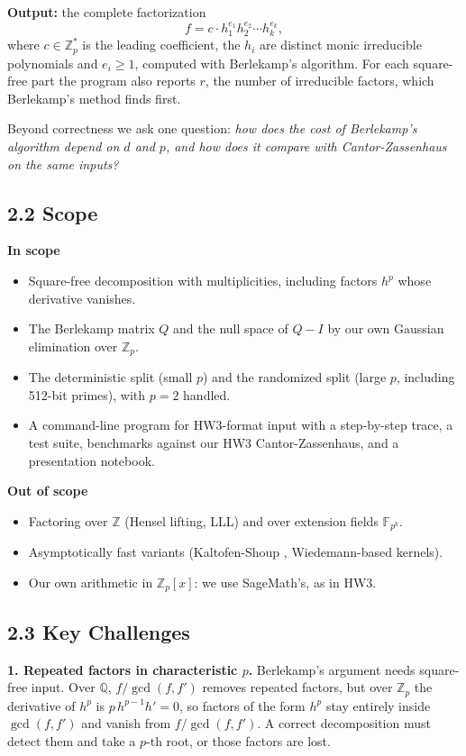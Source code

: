 \documentclass[11pt,a4paper]{article}
\newcommand{\Zp}{\mathbb{Z}_p}
\newcommand{\Zpx}{\mathbb{Z}_p[x]}
\begin{document}
\textbf{Output:} the complete factorization
\[
  f = c \cdot h_1^{e_1} h_2^{e_2} \cdots h_k^{e_k},
\]
where $c \in \Zp^{*}$ is the leading coefficient, the $h_i$ are distinct monic irreducible
polynomials and $e_i \ge 1$, computed with Berlekamp's algorithm. For each square-free part the
program also reports $r$, the number of irreducible factors, which Berlekamp's method finds first.

Beyond correctness we ask one question: \emph{how does the cost of Berlekamp's algorithm depend on
$d$ and $p$, and how does it compare with Cantor-Zassenhaus on the same inputs?}

\subsection*{2.2 Scope}

\textbf{In scope}
\begin{itemize}
    \item Square-free decomposition with multiplicities, including factors $h^p$ whose derivative vanishes.
    \item The Berlekamp matrix $Q$ and the null space of $Q - I$ by our own Gaussian elimination over $\Zp$.
    \item The deterministic split (small $p$) and the randomized split (large $p$, including 512-bit primes), with $p = 2$ handled.
    \item A command-line program for HW3-format input with a step-by-step trace, a test suite, benchmarks against our HW3 Cantor-Zassenhaus, and a presentation notebook.
\end{itemize}

\textbf{Out of scope}
\begin{itemize}
    \item Factoring over $\mathbb{Z}$ (Hensel lifting, LLL) and over extension fields $\mathbb{F}_{p^k}$.
    \item Asymptotically fast variants (Kaltofen-Shoup \cite{kaltofenshoup}, Wiedemann-based kernels).
    \item Our own arithmetic in $\Zpx$: we use SageMath's, as in HW3.
\end{itemize}

\subsection*{2.3 Key Challenges}

\textbf{1. Repeated factors in characteristic $p$.}
Berlekamp's argument needs square-free input. Over $\mathbb{Q}$, $f/\gcd(f, f')$ removes repeated
factors, but over $\Zp$ the derivative of $h^p$ is $p\,h^{p-1}h' = 0$, so factors of the form
$h^p$ stay entirely inside $\gcd(f, f')$ and vanish from $f/\gcd(f, f')$. A correct decomposition must detect them and take a $p$-th
root, or those factors are lost.
\end{document}
